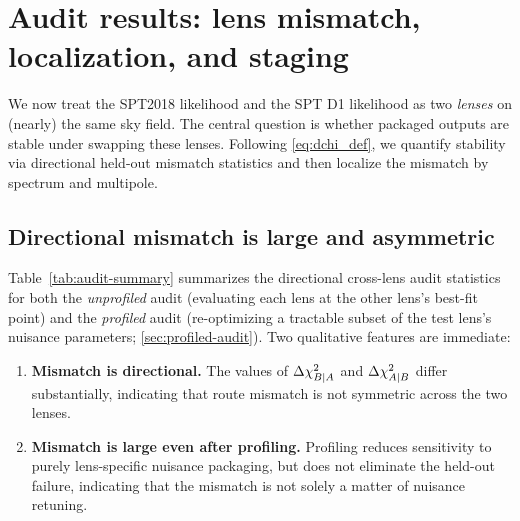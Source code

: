 \section{Audit results: lens mismatch, localization, and staging}
\label{sec:results-audits}

We now treat the SPT2018 likelihood and the SPT D1 likelihood as two \emph{lenses} on (nearly) the same sky field. The central question is whether packaged outputs are stable under swapping these lenses. Following \cref{eq:dchi_def}, we quantify stability via directional held-out mismatch statistics and then localize the mismatch by spectrum and multipole.

\subsection{Directional mismatch is large and asymmetric}
Table~\ref{tab:audit-summary} summarizes the directional cross-lens audit statistics for both the \emph{unprofiled} audit (evaluating each lens at the other lens's best-fit point) and the \emph{profiled} audit (re-optimizing a tractable subset of the test lens's nuisance parameters; \cref{sec:profiled-audit}). Two qualitative features are immediate:
\begin{enumerate}[leftmargin=*, itemsep=2pt]
  \item \textbf{Mismatch is directional.} The values of $\Delta \chi^2_{B|A}$ and $\Delta \chi^2_{A|B}$ differ substantially, indicating that route mismatch is not symmetric across the two lenses.
  \item \textbf{Mismatch is large even after profiling.} Profiling reduces sensitivity to purely lens-specific nuisance packaging, but does not eliminate the held-out failure, indicating that the mismatch is not solely a matter of nuisance retuning.
\end{enumerate}

\begin{table}[t]
  \centering
  \caption{Directional cross-lens audit summary for SPT2018 vs SPT D1, with and without common-staging. The unprofiled audit uses direct evaluation of the test lens at the train lens's best-fit point; the profiled audit re-optimizes a tractable subset of test-lens nuisance parameters at fixed shared parameters (\cref{sec:profiled-audit}). ``Common-staging'' restricts the D1 lens to the SPT2018 multipole support (\cref{sec:common-staging}).}
  \label{tab:audit-summary}
  \resizebox{\linewidth}{!}{}
\end{table}

